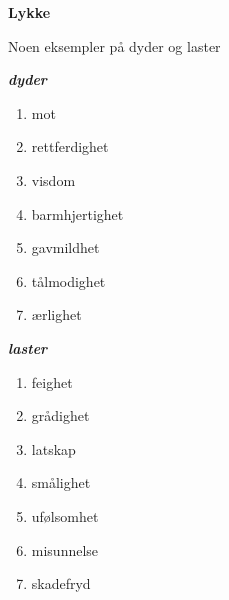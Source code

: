 \documentclass[11pt, a4paper]{article}
\newenvironment{sectionbox}[1][]{%
    \begin{sectionboxinner}
    \textbf{\large #1}
    \vspace{1pt}
    \newline
}{%
    \end{sectionboxinner}
}
\begin{document}
\begin{sectionbox}[Lykke]
\begin{flushleft}
        Noen eksempler på dyder og laster \newline
        \parbox[t]{0.3\textwidth}{\textbf{\textit{dyder}}
            \begin{enumerate}
                \item mot
                \item rettferdighet
                \item visdom
                \item barmhjertighet
                \item gavmildhet
                \item tålmodighet
                \item ærlighet
            \end{enumerate}}
        \parbox[t]{0.3\textwidth}{\textbf{\textit{laster}}
            \begin{enumerate}
                \item feighet
                \item grådighet
                \item latskap
                \item smålighet
                \item ufølsomhet
                \item misunnelse
                \item skadefryd
            \end{enumerate}}

       
    \end{flushleft}
\end{sectionbox}
\end{document}
